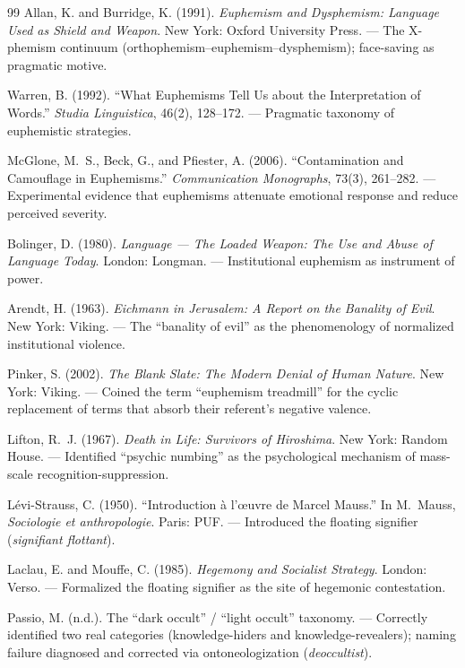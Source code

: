 \documentclass[11pt, oneside]{article}
\theoremstyle{definition}
\begin{document}
\begin{thebibliography}{99}
Allan, K. and Burridge, K. (1991).
\textit{Euphemism and Dysphemism: Language Used as Shield and Weapon}.
New York: Oxford University Press.
--- The X-phemism continuum (orthophemism--euphemism--dysphemism); face-saving as pragmatic motive.

Warren, B. (1992).
``What Euphemisms Tell Us about the Interpretation of Words.''
\textit{Studia Linguistica}, 46(2), 128--172.
--- Pragmatic taxonomy of euphemistic strategies.

McGlone, M.~S., Beck, G., and Pfiester, A. (2006).
``Contamination and Camouflage in Euphemisms.''
\textit{Communication Monographs}, 73(3), 261--282.
--- Experimental evidence that euphemisms attenuate emotional response and reduce perceived severity.

Bolinger, D. (1980).
\textit{Language --- The Loaded Weapon: The Use and Abuse of Language Today}.
London: Longman.
--- Institutional euphemism as instrument of power.

Arendt, H. (1963).
\textit{Eichmann in Jerusalem: A Report on the Banality of Evil}.
New York: Viking.
--- The ``banality of evil'' as the phenomenology of normalized institutional violence.

Pinker, S. (2002).
\textit{The Blank Slate: The Modern Denial of Human Nature}.
New York: Viking.
--- Coined the term ``euphemism treadmill'' for the cyclic replacement of terms that absorb their referent's negative valence.

Lifton, R.~J. (1967).
\textit{Death in Life: Survivors of Hiroshima}.
New York: Random House.
--- Identified ``psychic numbing'' as the psychological mechanism of mass-scale recognition-suppression.

L\'{e}vi-Strauss, C. (1950).
``Introduction \`{a} l'\oe uvre de Marcel Mauss.''
In M.~Mauss, \textit{Sociologie et anthropologie}.
Paris: PUF.
--- Introduced the floating signifier (\textit{signifiant flottant}).

Laclau, E. and Mouffe, C. (1985).
\textit{Hegemony and Socialist Strategy}.
London: Verso.
--- Formalized the floating signifier as the site of hegemonic contestation.

Passio, M. (n.d.).
The ``dark occult'' / ``light occult'' taxonomy.
--- Correctly identified two real categories (knowledge-hiders and knowledge-revealers); naming failure diagnosed and corrected via ontoneologization (\textit{deoccultist}).

\end{thebibliography}
\end{document}
